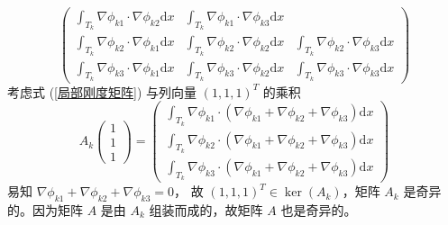 \documentclass[a4paper]{article}
\begin{document}
\begin{enumerate}
\begin{equation}
\begin{pmatrix}
            \int_{T_k}\nabla \phi_{k1} \cdot \nabla \phi_{k2} \text{d}x &
            \int_{T_k}\nabla \phi_{k1} \cdot \nabla \phi_{k3} \text{d}x\\
            \int_{T_k}\nabla \phi_{k2} \cdot \nabla \phi_{k1} \text{d}x &
            \int_{T_k}\nabla \phi_{k2} \cdot \nabla \phi_{k2} \text{d}x &
            \int_{T_k}\nabla \phi_{k2} \cdot \nabla \phi_{k3} \text{d}x\\
            \int_{T_k}\nabla \phi_{k3} \cdot \nabla \phi_{k1} \text{d}x &
            \int_{T_k}\nabla \phi_{k3} \cdot \nabla \phi_{k2} \text{d}x &
            \int_{T_k}\nabla \phi_{k3} \cdot \nabla \phi_{k3} \text{d}x
        \end{pmatrix}
        \label{局部刚度矩阵}
    \end{equation}
    考虑式 (\ref{局部刚度矩阵}) 与列向量 $(1,1,1)^T$ 的乘积
    \begin{equation}
        A_k
        \begin{pmatrix}
            1\\1\\1
        \end{pmatrix}
        =
        \begin{pmatrix}
            \int_{T_k}\nabla \phi_{k1} \cdot (\nabla \phi_{k1}
            + \nabla \phi_{k2} + \nabla \phi_{k3}) \text{d}x\\
            \int    _{T_k}\nabla \phi_{k2} \cdot (\nabla \phi_{k1}
            + \nabla \phi_{k2} + \nabla \phi_{k3}) \text{d}x\\
            \int_{T_k}\nabla \phi_{k3} \cdot (\nabla \phi_{k1}
            + \nabla \phi_{k2} + \nabla \phi_{k3}) \text{d}x
        \end{pmatrix}
    \end{equation}
    易知 $\nabla \phi_{k1} + \nabla \phi_{k2} + \nabla \phi_{k3} = 0$，
    故 $(1,1,1)^T\in \ker (A_k)$，矩阵 $A_k$ 是奇异的。因为矩阵 $A$ 是由 $A_k$
    组装而成的，故矩阵 $A$ 也是奇异的。
\end{enumerate}


\printbibliography
\end{document}
